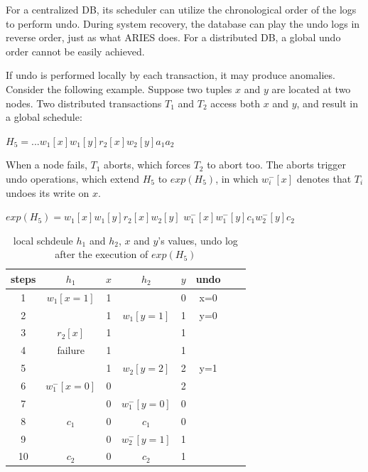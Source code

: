 \documentclass[conference]{IEEEtran}
\begin{document}
For a centralized DB, its scheduler can utilize the chronological order of the logs to perform undo.
During system recovery, the database can play the undo logs in reverse order, just as what ARIES \cite{ARIES:journals/tods/MohanHLPS92} does.
For a distributed DB, a global undo order cannot be easily achieved.

If undo is performed locally by each transaction, it may produce anomalies.
Consider the following example. Suppose two tuples $x$ and $y$ are located at two nodes.
Two distributed transactions $T_1$ and $T_2$ access both $x$ and $y$, and result in a global schedule:

\begin{center}
${H_5 = ...w_1[x]w_1[y]r_2[x]w_2[y]a_1a_2}$
\end{center}

When a node fails, ${T_1}$ aborts, which forces ${T_2}$ to abort too.
The aborts trigger undo operations, which extend ${H_5}$ to ${exp(H_5)}$,
in which ${w^-_i[x]}$ denotes that ${T_i}$ undoes its write on ${x}$.

\begin{center}
  ${exp(H_5) =  w_1[x]w_1[y]r_2[x] w_2[y]}$
  ${w^-_1[x]w^-_1[y]  c_1 w^-_2[y]c_2}$
\end{center}


\begin{table}[tbp]
  \centering
  \caption{local schdeule $h_1$ and $h_2$, $x$ and $y$'s values, undo log after the execution of ${exp(H_5)}$}
  \begin{tabular}{|c|c|c|c|c|c|c|c|}
  \hline
steps & $h_1$ & $x$ & $h_2$ & $y$ & undo   \\
  \hline
  \hline
 1& $w_1[x=1]$ & 1 & &  0 & x=0  \\
  \hline
  2& & 1 & $w_1[y=1]$ & 1 & y=0   \\
  \hline
3 & $r_2[x]$ & 1 & & 1 &    \\

  \hline
 4 & failure  & 1 & & 1 &  \\
  \hline
 5& & 1 &   $w_2[y=2]$ & 2 & y=1  \\
  \hline
6  & $w^-_1[x=0]$ & 0 && 2 &   \\
  \hline
7 & & 0 & $w^-_1[y=0]$ & 0 &   \\
  \hline


8  & $c_1$ & 0 &$c_1$& 0 &   \\
  \hline
9 & & 0 &  $w^-_2[y=1]$& 1 &   \\
  \hline
10 & $c_2$ & 0 &$c_2$& 1 &  \\
  \hline
  \end{tabular}

\label{tbl:x_y_vlues}
\end{table}
\end{document}

